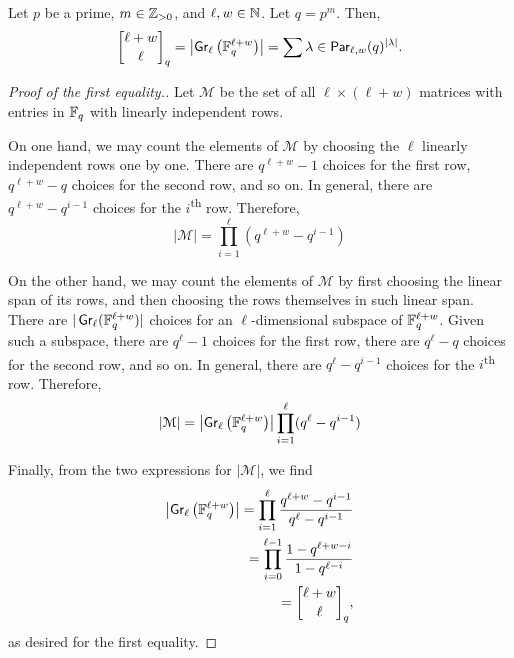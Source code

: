 \begin{lemma} \label{lem:grassmanian_qbinomial_prime_power}
    Let \(p\) be a prime, \(m \in \mathbb{Z}_{> 0}\), and \(\ell, w \in \mathbb{N}\).
    Let \(q = p^m\).
    Then,
    \begin{equation}
        \qbinom{\ell + w}{\ell}
        = \left|
            \Grassmanian_\ell\left(\finitefield{q}^{\ell + w} \right)
        \right|
        = \sum{\lambda \in \Par_{\ell, w}} (q)^{|\lambda|}.
    \end{equation}
\end{lemma}

\begin{proof}[Proof of the first equality.]
    Let \(\mathcal{M}\) be the set of all \(\ell \times (\ell + w)\) matrices with entries in \(\mathbb{F}_{q}\) with linearly independent rows.

    On one hand, we may count the elements of \(\mathcal{M}\) by choosing the \(\ell\) linearly independent rows one by one.
    There are \(q^{\ell + w} - 1\) choices for the first row,
    \(q^{\ell + w} - q\) choices for the second row, and so on.
    In general, there are \(q^{\ell + w} - q^{i-1}\) choices for the \(i\)\textsuperscript{th} row.
    Therefore,
    \begin{equation}
        \left|
            \mathcal{M}
        \right|
        = \prod_{i=1}^{\ell} (q^{\ell + w} - q^{i-1})
    \end{equation}

    On the other hand, we may count the elements of \(\mathcal{M}\) by first choosing the linear span of its rows, and then choosing the rows themselves in such linear span.
    There are \(|\operatorname{\mathsf{Gr}}_\ell(\mathbb{F}_{q}^{\ell + w})|\) choices for an \(\ell\)-dimensional subspace of \(\mathbb{F}_{q}^{\ell + w}\).
    Given such a subspace,
    there are \(q^{\ell} - 1\) choices for the first row,
    there are \(q^{\ell} - q\) choices for the second row, and so on.
    In general, there are \(q^{\ell} - q^{i-1}\) choices for the \(i\)\textsuperscript{th} row.
    Therefore,
    \begin{equation}
        \left|
            \mathcal{M}
        \right|
        = \left|
            \operatorname{\mathsf{Gr}}_\ell\left(\mathbb{F}_{q}^{\ell + w} \right)
        \right|
        \prod_{i=1}^{\ell} (q^{\ell} - q^{i-1})
    \end{equation}

    Finally, from the two expressions for \(\left| \mathcal{M} \right|\), we find
    \begin{align}
        \left|
            \Grassmanian_\ell\left(\finitefield{q}^{\ell + w} \right)
        \right|
        = \prod_{i=1}^{\ell} \frac{q^{\ell + w} - q^{i-1}}{q^{\ell} - q^{i-1}} \\
        = \prod_{i=0}^{\ell - 1} \frac{1 - q^{\ell + w - i}}{1 - q^{\ell - i}} \\
        = \qbinom{\ell + w}{\ell},
    \end{align}
    as desired for the first equality.
\end{proof}

